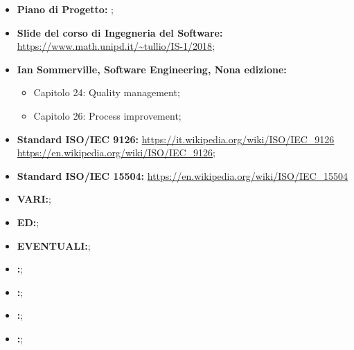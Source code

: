 \begin{itemize}
	\item \textbf{Piano di Progetto:} \PdP;
	\item \textbf{Slide del corso di Ingegneria del Software:}\newline
		  		 \url{https://www.math.unipd.it/~tullio/IS-1/2018};
	\item \textbf{Ian Sommerville, Software Engineering, Nona edizione:}
		\begin{itemize}
		  	\item Capitolo 24: Quality management;
		  	\item Capitolo 26: Process improvement;
		\end{itemize}
	\item \textbf{Standard ISO/IEC 9126:}\newline
		  		  \url{https://it.wikipedia.org/wiki/ISO/IEC_9126}\newline
				  \url{https://en.wikipedia.org/wiki/ISO/IEC_9126};
	\item \textbf{Standard ISO/IEC 15504:}\newline
				  \url{https://en.wikipedia.org/wiki/ISO/IEC_15504}
	\item \textbf{VARI:};
	\item \textbf{ED:};
	\item \textbf{EVENTUALI:};
	\item \textbf{:};
	\item \textbf{:};
	\item \textbf{:};
	\item \textbf{:};
		
\end{itemize}